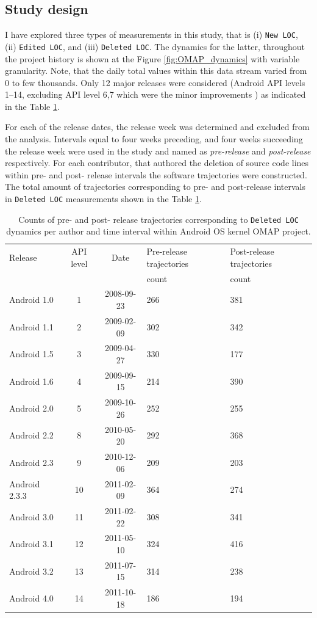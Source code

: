 \subsection{Study design}
I have explored three types of measurements in this study, that is (i) \texttt{New LOC}, (ii) \texttt{Edited LOC}, and (iii) \texttt{Deleted LOC}. The dynamics for the latter, throughout the project history is shown at the Figure \ref{fig:OMAP_dynamics} with variable granularity. Note, that the daily total values within this data stream varied from 0 to few thousands. Only 12 major releases were considered (Android API levels 1--14, excluding API level 6,7 which were the minor improvements \cite{api-levels}) as indicated in the Table \ref{android_table1}. 

For each of the release dates, the release week was determined and excluded from the analysis. Intervals equal to four weeks preceding, and four weeks succeeding the release week were used in the study and named as \textit{pre-release} and \textit{post-release} respectively. For each contributor, that authored the deletion of source code lines within pre- and post- release intervals the software trajectories were constructed. The total amount of trajectories corresponding to pre- and post-release intervals in \texttt{Deleted LOC} measurements shown in the Table \ref{android_table1}. 

\begin{table}[t]
\caption{Counts of pre- and post- release trajectories corresponding to \texttt{Deleted LOC} dynamics per author and time interval within Android OS kernel OMAP project.}
\label{android_table1}
\centering
\begin{tabularx}{\linewidth}{l c c X X}
\hline
Release & API level & Date & Pre-release trajectories & Post-release trajectories\\
& & & count & count\\
\hline
Android 1.0    & 1 & 2008-09-23    &  266 &    381\\
Android 1.1    & 2 & 2009-02-09     & 302 &    342\\
Android 1.5     & 3 & 2009-04-27    & 330  &   177\\
Android 1.6     & 4 & 2009-09-15    & 214  &   390\\
Android 2.0     & 5 & 2009-10-26    & 252  &   255\\
Android 2.2     & 8 & 2010-05-20    &  292  &   368\\
Android 2.3     & 9  & 2010-12-06    &  209   &  203\\
Android 2.3.3   & 10 & 2011-02-09  &   364  &   274\\
Android 3.0     & 11 & 2011-02-22    &  308   &  341\\
Android 3.1     & 12 & 2011-05-10    &  324 &    416\\
Android 3.2     & 13 & 2011-07-15   &   314 &    238\\
Android 4.0     & 14 & 2011-10-18    &  186  &   194\\
\hline
\end{tabularx}
\end{table}

